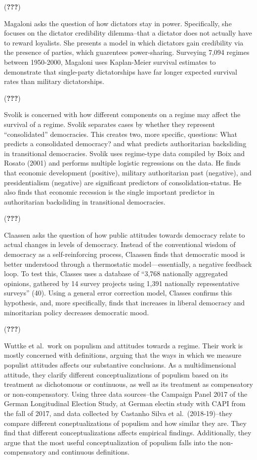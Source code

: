 \documentclass[
  english,
  man]{apa6}
\begin{document}
({\textbf{???}})

Magaloni asks the question of how dictators stay in power. Specifically, she focuses on the dictator credibility dilemma--that a dictator does not actually have to reward loyalists. She presents a model in which dictators gain credibility via the presence of parties, which guarentees power-sharing. Surveying 7,094 regimes between 1950-2000, Magaloni uses Kaplan-Meier survival estimates to demonstrate that single-party dictatorships have far longer expected survival rates than military dictatorships.

({\textbf{???}})

Svolik is concerned with how different components on a regime may affect the survival of a regime. Svolik separates cases by whether they represent \enquote{consolidated} democracies. This creates two, more specific, questions: What predicts a consolidated democracy? and what predicts authoritarian backsliding in transitional democracies. Svolik uses regime-type data compiled by Boix and Rosato (2001) and performs multiple logistic regressions on the data. He finds that economic development (positive), military authoritarian past (negative), and presidentialism (negative) are significant predictors of consolidation-status. He also finds that economic recession is the single important predictor in authoritarian backsliding in transitional democracies.

({\textbf{???}})

Claassen asks the question of how public attitudes towards democracy relate to actual changes in levels of democracy. Instead of the conventional wisdom of democracy as a self-reinforcing process, Claassen finds that democratic mood is better understood through a thermostatic model---essentially, a negative feedback loop. To test this, Classes uses a database of \enquote{3,768 nationally aggregated opinions, gathered by 14 survey projects using 1,391 nationally representative surveys} (40). Using a general error correction model, Classes confirms this hypothesis, and, more specifically, finds that increases in liberal democracy and minoritarian policy decreases democratic mood.

({\textbf{???}})

Wuttke et al.~work on populism and attitudes towards a regime. Their work is mostly concerned with definitions, arguing that the ways in which we measure populist attitudes affects our substantive conclusions. As a multidimensional attitude, they clarify different conceptualizations of populism based on its treatment as dichotomous or continuous, as well as its treatment as compensatory or non-compensatory. Using three data sources--the Campaign Panel 2017 of the German Longitudinal Election Study, at German electin study with CAPI from the fall of 2017, and data collected by Castanho Silva et al.~(2018-19)--they compare different coneptualizations of populism and how similar they are. They find that different conceptualizations affects empirical findings. Additionally, they argue that the most useful conceptualization of populism falls into the non-compensatory and continuous definitions.
\end{document}
